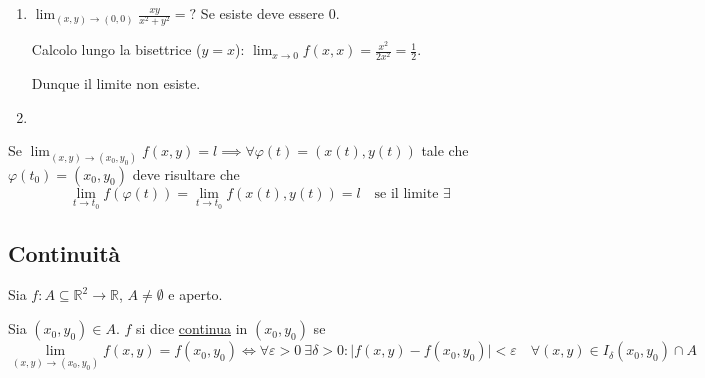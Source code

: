 \begin{example}
\begin{enumerate}
    \item $\lim_{(x, y) \to (0, 0)} \frac{xy}{x^2 + y^2} = ?$ Se esiste deve essere $0$.

    Calcolo lungo la bisettrice ($y = x$): $\lim_{x \to 0} f(x, x) = \frac{x^2}{2x^2} = \frac{1}{2}$.

    Dunque il limite non esiste.

    \item {}
\end{enumerate}
\end{example}

\begin{oss}
Se $\lim_{(x, y) \to (x_0, y_0)} f(x, y) = l \implies \forall \varphi(t) = (x(t), y(t))$ tale che $\varphi(t_0) = (x_0, y_0)$ deve risultare che
\[
\lim_{t \to t_0} f(\varphi(t)) = \lim_{t \to t_0} f(x(t), y(t)) = l \quad \text{se il limite } \exists
\]
\end{oss}

\subsection{Continuità}

\begin{definition}
Sia $f : A \subseteq \mathbb{R}^2 \to \mathbb{R}$, $A \neq \emptyset$ e aperto.

Sia $(x_0, y_0) \in A$. $f$ si dice \underline{continua} in $(x_0, y_0)$ se
\[
\lim_{(x, y) \to (x_0, y_0)} f(x, y) = f(x_0, y_0) \iff \forall \varepsilon > 0 \ \exists \delta > 0 : \vert f(x, y) - f(x_0, y_0) \vert < \varepsilon \quad \forall (x, y) \in I_\delta(x_0, y_0) \cap A
\]
\end{definition}

